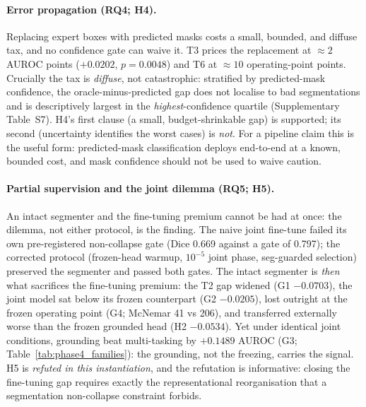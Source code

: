 \documentclass[jimh,article,submit,moreauthors,pdftex]{Definitions/tsp}
\begin{document}
\paragraph{Error propagation (RQ4; H4).}
Replacing expert boxes with predicted masks costs a small, bounded, and
diffuse tax, and no confidence gate can waive it. T3 prices the
replacement at ${\approx}2$ AUROC points ($+0.0202$, $p{=}0.0048$) and T6
at ${\approx}10$ operating-point points. Crucially the tax is
\emph{diffuse}, not catastrophic: stratified by predicted-mask confidence,
the oracle-minus-predicted gap does not localise to bad segmentations and
is descriptively largest in the \emph{highest}-confidence quartile
(Supplementary Table~S7). H4's first clause (a small, budget-shrinkable
gap) is supported; its second (uncertainty identifies the worst cases) is
\emph{not}. For a pipeline claim this is the useful form: predicted-mask
classification deploys end-to-end at a known, bounded cost, and mask
confidence should not be used to waive caution.

\paragraph{Partial supervision and the joint dilemma (RQ5; H5).}
An intact segmenter and the fine-tuning premium cannot be had at once:
the dilemma, not either protocol, is the finding. The naive joint
fine-tune failed its own pre-registered non-collapse gate (Dice 0.669
against a gate of 0.797); the corrected protocol (frozen-head warmup,
$10^{-5}$ joint phase, seg-guarded selection) preserved the segmenter and
passed both gates. The intact segmenter is \emph{then} what sacrifices the
fine-tuning premium: the T2 gap widened (G1 $-0.0703$),
the joint model sat below its frozen counterpart (G2 $-0.0205$), lost
outright at the frozen operating point (G4; McNemar 41 vs 206), and
transferred externally worse than the frozen grounded head (H2
$-0.0534$). Yet under identical joint conditions, grounding beat
multi-tasking by $+0.1489$ AUROC (G3;
Table~\ref{tab:phase4_families}): the grounding, not the freezing,
carries the signal. H5 is \emph{refuted in this instantiation}, and the
refutation is informative: closing the fine-tuning gap requires exactly
the representational reorganisation that a segmentation non-collapse
constraint forbids.
\end{document}
